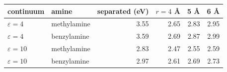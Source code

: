 \begin{tabular}{llrrrr}
\toprule
continuum & amine & separated (eV) & $r=4$ \AA & 5 \AA & 6 \AA \\
\midrule
$\varepsilon=4$ & methylamine & 3.55 & 2.65 & 2.83 & 2.95 \\
$\varepsilon=4$ & benzylamine & 3.59 & 2.69 & 2.87 & 2.99 \\
$\varepsilon=10$ & methylamine & 2.83 & 2.47 & 2.55 & 2.59 \\
$\varepsilon=10$ & benzylamine & 2.97 & 2.61 & 2.69 & 2.73 \\
\bottomrule
\end{tabular}
